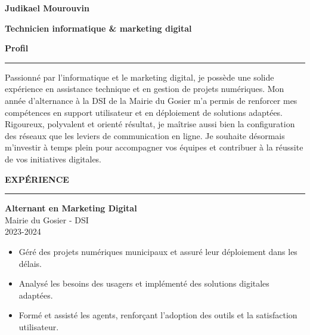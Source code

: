 \documentclass{article}
\newcommand{\cvsection}[1]{%
  \par\bigskip                %
  {\bfseries\Large #1}\par
  \noindent\rule{\linewidth}{0.8pt}\par
  \medskip                    %
}
\newcommand*{\ClipSep}{0.4cm}
\begin{document}
\pagestyle{empty}
\begin{paracol}{2}

\begin{minipage}{0.7\linewidth}
{\LARGE\textbf{Judikael Mourouvin}}

\bigskip
{\large\textbf{Technicien informatique \& marketing digital}}
\end{minipage}\hfill
\begin{minipage}{0.18\linewidth}
\end{minipage}

\cvsection{Profil}
Passionné par l’informatique et le marketing digital, je possède une solide expérience en assistance technique et en gestion de projets numériques. Mon année d’alternance à la DSI de la Mairie du Gosier m’a permis de renforcer mes compétences en support utilisateur et en déploiement de solutions adaptées. Rigoureux, polyvalent et orienté résultat, je maîtrise aussi bien la configuration des réseaux que les leviers de communication en ligne. Je souhaite désormais m’investir à temps plein pour accompagner vos équipes et contribuer à la réussite de vos initiatives digitales.

\cvsection{EXPÉRIENCE}

\colorbox{maincolor}{%
  \begin{minipage}{\linewidth}
    \textbf{Alternant en Marketing Digital} \\ Mairie du Gosier - DSI \\ 2023-2024
    \begin{itemize}
      \item Géré des projets numériques municipaux et assuré leur déploiement dans les délais. \item Analysé les besoins des usagers et implémenté des solutions digitales adaptées. \item Formé et assisté les agents, renforçant l’adoption des outils et la satisfaction utilisateur.
    \end{itemize}
  \end{minipage}}


\end{paracol}
\end{document}
